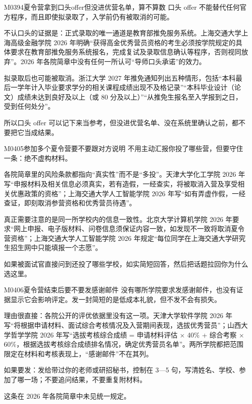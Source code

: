 \begin{qa}{M0394}{夏令营拿到口头offer但没进优营名单，算不算数}
口头 offer 不能替代任何官方程序，而且即使拟录取了，入学前仍有被取消的可能。

不认口头的证据是：正式录取的唯一通道是教育部推免服务系统。上海交通大学上海高级金融学院 2026 年明确“获得高金优秀营员资格的考生必须按学院规定的具体要求在教育部推免服务系统报名，完成复试及录取信息确认等程序，否则视同放弃”。2026 年各院简章中没有任何一所认可“导师口头承诺”的效力。

拟录取后也可能被取消。浙江大学 2027 年推免通知列出五种情形，包括“本科最后一学年计入毕业要求学分的相关课程成绩出现不及格记录”“本科毕业设计（论文）成绩未达到良好及以上（或 80 分及以上）”“从推免生报名至入学报到之日，受到任何处分”。

所以口头 offer 可以记下来当参考，但没进优营名单、没在系统里确认之前，都不要把它当成结果。
\end{qa}

\begin{qa}{M0405}{参加多个夏令营要不要跟对方说明}
不用主动汇报你投了哪些营，但要守住一条：绝不虚构材料。

各院简章里的风险条款都指向“真实性”而不是“多投”。天津大学化工学院 2026 年写“申报材料及相关信息必须真实，若有造假，一经查实，将被取消入营及享受相关优惠政策的资格”；上海交通大学人工智能学院 2026 年写“如有弄虚作假，一经查证，即刻取消参营资格和优秀营员待遇”。

真正需要注意的是同一所学校内的信息一致性。北京大学计算机学院 2026 年要求“网上申报、电子版材料、问卷信息须保证内容一致，如发现不一致将取消夏令营资格”；上海交通大学人工智能学院 2026 年规定“每位同学在上海交通大学研究生招生网中只能填报一个志愿”。

如果被面试官直接问到还投了哪些学校，如实简短回答，然后把话题拉回你为什么选这里。
\end{qa}

\begin{qa}{M0406}{夏令营结束后要不要发感谢邮件}
没有哪所学院要求发感谢邮件，也没有证据显示它会影响评定。发一封简短的是低成本礼貌，但不发不会有损失。

理由很直接：各院公开的评优依据里没有这一项。天津大学软件学院 2026 年写“将根据申请材料、面试综合考核情况及入营期间表现，选拔优秀营员”；山西大学哲学学院 2026 年写“选拔考核综合成绩 = 申请材料评估 × 40\% + 综合考察 × 60\%，根据选拔考核综合成绩排名情况，确定优秀营员名单”。两所学院都把范围限定在材料和考核表现上，“感谢邮件”不在其列。

如果要发：发给带过你的老师或研招秘书，控制在 3—5 句，写清姓名、学校、参加了哪一场；不要追问结果，不要重复附材料。

这条在 2026 年各院简章中未见统一规定。
\end{qa}

